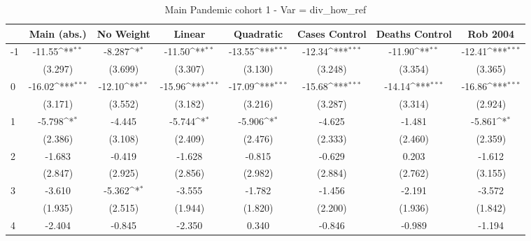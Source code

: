 \documentclass{article}
\begin{document}
{
\def\sym#1{\ifmmode^{#1}\else\(^{#1}\)\fi}
\begin{longtable}{l*{7}{c}}
\caption{Main Pandemic cohort 1 - Var = div\_how\_ref}\\
\hline\hline\endfirsthead\hline\endhead\hline\endfoot\endlastfoot
                &\multicolumn{1}{c}{Main (abs.)}&\multicolumn{1}{c}{No Weight}&\multicolumn{1}{c}{Linear}&\multicolumn{1}{c}{Quadratic}&\multicolumn{1}{c}{Cases Control}&\multicolumn{1}{c}{Deaths Control}&\multicolumn{1}{c}{Rob 2004}\\
\hline
-1              &   -11.55\sym{**} &   -8.287\sym{*}  &   -11.50\sym{**} &   -13.55\sym{***}&   -12.34\sym{***}&   -11.90\sym{**} &   -12.41\sym{***}\\
                &  (3.297)         &  (3.699)         &  (3.307)         &  (3.130)         &  (3.248)         &  (3.354)         &  (3.365)         \\
0               &   -16.02\sym{***}&   -12.10\sym{**} &   -15.96\sym{***}&   -17.09\sym{***}&   -15.68\sym{***}&   -14.14\sym{***}&   -16.86\sym{***}\\
                &  (3.171)         &  (3.552)         &  (3.182)         &  (3.216)         &  (3.287)         &  (3.314)         &  (2.924)         \\
1               &   -5.798\sym{*}  &   -4.445         &   -5.744\sym{*}  &   -5.906\sym{*}  &   -4.625         &   -1.481         &   -5.861\sym{*}  \\
                &  (2.386)         &  (3.108)         &  (2.409)         &  (2.476)         &  (2.333)         &  (2.460)         &  (2.359)         \\
2               &   -1.683         &   -0.419         &   -1.628         &   -0.815         &   -0.629         &    0.203         &   -1.612         \\
                &  (2.847)         &  (2.925)         &  (2.856)         &  (2.982)         &  (2.884)         &  (2.762)         &  (3.155)         \\
3               &   -3.610         &   -5.362\sym{*}  &   -3.555         &   -1.782         &   -1.456         &   -2.191         &   -3.572         \\
                &  (1.935)         &  (2.515)         &  (1.944)         &  (1.820)         &  (2.200)         &  (1.936)         &  (1.842)         \\
4               &   -2.404         &   -0.845         &   -2.350         &    0.340         &   -0.846         &   -0.989         &   -1.194         \\

\end{longtable}}
\end{document}

